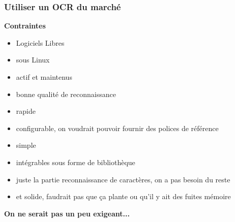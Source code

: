 \documentclass[xcolor=dvipsnames]{beamer}
\begin{document}
\begin{frame}
\frametitle{Utiliser un OCR du marché}
    \begin{center}\begin{alertblock}{}
            \textbf{\Large Contraintes}\pause
    \end{alertblock}\end{center}
    \begin{itemize}
        \item Logiciels Libres\pause
        \item sous Linux\pause
        \item actif et maintenus\pause
        \item bonne qualité de reconnaissance\pause
        \item rapide\pause
        \item configurable, on voudrait pouvoir fournir des polices de référence\pause
        \item simple\pause
        \item intégrables sous forme de bibliothèque\pause
        \item juste la partie reconnaissance de caractères, on a pas besoin du reste\pause
        \item et solide, faudrait pas que ça plante ou qu'il y ait des fuites mémoire\pause
    \end{itemize}
    \begin{center}\begin{alertblock}{}
            \begin{center}\textbf{\Large On ne serait pas un peu exigeant...}\end{center}
    \end{alertblock}\end{center}
\end{frame}
\end{document}
